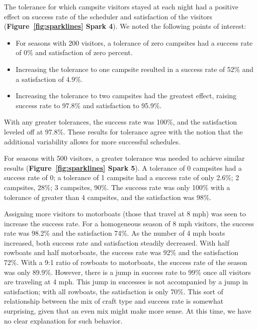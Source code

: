 \documentclass[11pt]{article} %
\begin{document}
The tolerance for which campsite visitors stayed at each night had a positive
effect on success rate of the scheduler and satisfaction of the visitors
(\textbf{Figure~\ref{fig:sparklines} Spark 4}).  We noted the following points
of interest:
\begin{itemize}
\item For seasons with
200 visitors, a tolerance of zero campsites had a success rate of 0\%
and satisfaction of zero percent.
\item Increasing the tolerance to one campsite
resulted in a success rate of 52\% and a satisfaction of 4.9\%.
\item Increasing the tolerance to two campsites had the greatest effect, raising
success rate to 97.8\% and satisfaction to 95.9\%.
\end{itemize}
With any greater tolerances, the success rate was 100\%, and the satisfaction
leveled off at 97.8\%.  These results for tolerance agree with the notion that
the additional variability allows for more successful schedules.

For seasons with 500 visitors, a greater tolerance was needed to achieve
similar results (\textbf{Figure~\ref{fig:sparklines} Spark 5}).
A tolerance of 0 campsites
had a success rate of 0; a tolerance of 1 campsite had a success rate of
only 2.6\%; 2 campsites, 28\%; 3 campsites, 90\%. The
success rate was only 100\% with a tolerance of greater than 4 campsites,
and the satisfaction was 98\%.

Assigning more visitors to motorboats (those that travel at 8 mph) was seen
to increase the success rate. For a homogeneous season of 8 mph visitors, the
success rate was 98.2\% and the satisfaction 74\%. As the number
of 4 mph boats increased, both success rate and satisfaction steadily decreased.
With half rowboats and half motorboats, the success rate was 92\% and
the satisfaction 72\%. With a 9:1 ratio of rowboats to motorboats, the
success rate of the season was only 89.9\%. However, there is a jump
in success rate to 99\% once all visitors are traveling at 4 mph. This
jump in successes is not accompanied by a jump in satisfaction; with all
rowboats, the satisfaction is only 70\%.  This sort of relationship
between the mix of craft type and success rate is somewhat
surprising, given that an even mix might make more sense.  At this time, we
have no clear explanation for such behavior.
\end{document}
